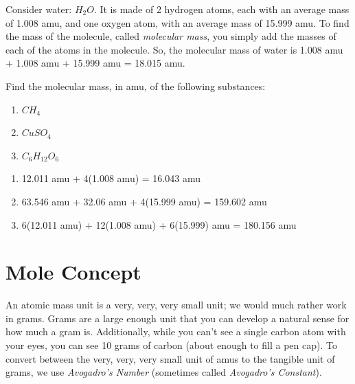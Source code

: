 Consider water: $H_2 O$. It is made of 2 hydrogen atoms, each with an average 
mass of 1.008 amu, and one oxygen atom, with an average mass of 15.999 amu. To 
find the mass of the molecule, called \textit{molecular mass}, you simply add the 
masses of each of the atoms in the molecule. So, the molecular mass of water is 
1.008 amu + 1.008 amu + 15.999 amu = 18.015 amu. 

\begin{Exercise}[title = {Determining Molecular Mass}, label = molecular]
Find the molecular mass, in amu, of the following substances:
\begin{enumerate}
\item $CH_4$
\item $CuSO_4$
\item $C_6H_{12}O_6$
\end{enumerate}
\end{Exercise} 

\begin{Answer}[ref = molecular]
\begin{enumerate}
\item 12.011 amu + 4(1.008 amu) = 16.043 amu
\item 63.546 amu + 32.06 amu + 4(15.999 amu) = 159.602 amu
\item 6(12.011 amu) + 12(1.008 amu) + 6(15.999) amu = 180.156 amu
\end{enumerate}
\end{Answer}

\section{Mole Concept}

An atomic mass unit is a very, very, very small unit; we would much rather work in
grams. Grams are a large enough unit that you can develop a natural sense for how 
much a gram is. Additionally, while you can't see a single carbon atom with your 
eyes, you can see 10 grams of carbon (about enough to fill a pen cap). To convert
between the very, very, very small unit of amus to the tangible unit of grams, we 
use \textit{Avogadro's Number} (sometimes called \textit{Avogadro's Constant}).

